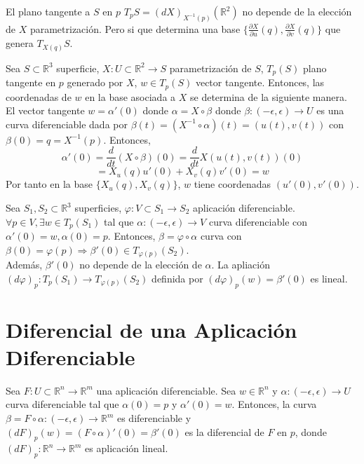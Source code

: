 \begin{obs}
  El plano tangente a $S$ en $p$ $T_{p}S = (dX)_{X^{-1}(p)}(\mathbb{R}^{2})$ no depende de la elección de $X$ parametrización. Pero si que determina una base $\{ \frac{\partial{X}}{\partial{u}}(q), \frac{\partial{X}}{\partial{v}}(q) \}$ que genera $T_{X(q)}S$.
\end{obs}

\begin{ejm}
  Sea $S \subset \mathbb{R}^{3}$ superficie, $X : U \subset \mathbb{R}^{2} \to S$ parametrización de $S$, $T_{p}(S)$ plano tangente en $p$ generado por $X$, $w \in T_{p}(S)$ vector tangente. Entonces, las coordenadas de $w$ en la base asociada a $X$ se determina de la siguiente manera. \\

  El vector tangente $w = \alpha'(0)$ donde $\alpha = X \circ \beta$ donde $\beta : (-\epsilon, \epsilon) \to U$ es una curva diferenciable dada por $\beta(t) = (X^{-1} \circ \alpha) (t) = (u(t), v(t))$ con $\beta(0) = q = X^{-1}(p)$. Entonces,
  \[ 
    \alpha'(0) = \frac{d{}}{d{t}}(X \circ \beta)(0) = \frac{d{}}{d{t}}X(u(t), v(t))(0)
  \] 
  \[ 
    = X_{u}(q) u'(0) + X_{v}(q) v'(0) = w
  \] 
  Por tanto en la base $\{ X_{u}(q), X_{v}(q) \}$, $w$ tiene coordenadas $(u'(0), v'(0))$.
\end{ejm}

\begin{obs}
  Sea $S_{1}, S_{2} \subset \mathbb{R}^{3}$ superficies, $\varphi : V \subset S_{1} \to S_{2}$ aplicación diferenciable. $\forall p \in V, \exists w \in T_{p}(S_{1})$ tal que $\alpha : (-\epsilon, \epsilon) \to V$ curva diferenciable con $\alpha'(0) = w, \alpha(0) = p$. Entonces, $\beta = \varphi \circ \alpha$ curva con $\beta(0) = \varphi(p) \Rightarrow \beta'(0) \in T_{\varphi(p)}(S_{2})$.\\

  Además, $\beta'(0)$ no depende de la elección de $\alpha$. La apliación $(d \varphi)_{p} : T_{p}(S_{1}) \to T_{\varphi(p)}(S_{2})$ definida por $(d \varphi)_{p}(w) = \beta'(0)$ es lineal.
\end{obs}

\section{Diferencial de una Aplicación Diferenciable}

\begin{defn}[Diferencial]
  Sea $F : U \subset \mathbb{R}^{n} \to \mathbb{R}^{m}$ una aplicación diferenciable. Sea $w \in \mathbb{R}^{n}$ y $\alpha : (-\epsilon, \epsilon) \to U$ curva diferenciable tal que $\alpha(0) = p$ y $\alpha'(0) = w$. Entonces, la curva $\beta = F \circ \alpha : (-\epsilon, \epsilon) \to \mathbb{R}^{m}$ es diferenciable y $(dF)_{p}(w) = (F \circ \alpha)'(0) = \beta'(0)$ es la diferencial de $F$ en $p$, donde $(d F)_{p} : \mathbb{R}^{n} \to \mathbb{R}^{m} $ es aplicación lineal.
\end{defn}


